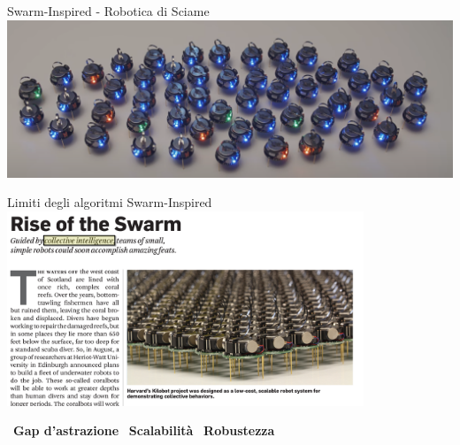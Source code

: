 \documentclass[presentation, 10pt,aspectratio=169]{beamer}\mode<presentation>{\usetheme{AMSBolognaFC}}
\begin{document}
\begin{frame}{Swarm-Inspired - Robotica di Sciame}
	\centering
	\href{https://www.youtube.com/watch?v=dDsmbwOrHJs&t=53s}{\includegraphics[width=\textwidth]{img/kilobot.png}}
\end{frame}

\begin{frame}{Limiti degli algoritmi Swarm-Inspired}
\centering
\href{https://dl.acm.org/doi/10.1145/2428556.2428562}{\includegraphics[width=0.8\textwidth]{img/rise-of-swarm.png}}

{\color{red}\faThumbsDown}~\textbf{Gap d'astrazione} {\color{red}\faThumbsDown} ~\textbf{Scalabilità} {\color{red}\faThumbsDown} ~\textbf{Robustezza} 
\end{frame}
\end{document}
